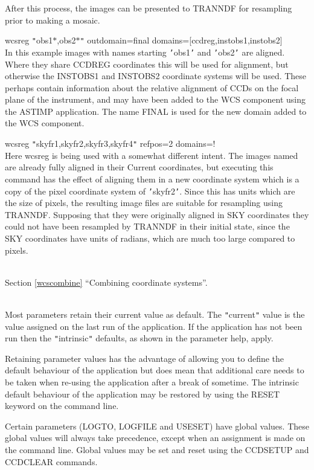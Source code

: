 \documentclass[twoside,11pt]{article}
\newcommand{\htmlref}[2]{#1}
\newcommand{\latexhtml}[2]{#1}
\renewcommand{\_}{\texttt{\symbol{95}}}
\newcommand{\qt}[1]{{\tt "}#1{\tt "}}
\newcommand{\routine}[1]{{\sc #1}}
\newcommand{\xroutine}[1]{\htmlref{{\sc #1}}{#1}}
\newcommand{\secref}[2]{\latexhtml{Section \ref{#1} ``#2''}{``\htmlref{#2}{#1}''}}
\newcommand{\sstexamplesubsection}[2]{\sloppy \item{\ssttt #1} \mbox{} \\ #2 }
\newcommand{\sstdiytopic}[2]{\item[#1:] \mbox{} \\[1.3ex] #2}
\newcommand{\sstexamplesubsection}[2]{\item[{\ssttt #1}] #2}
\newcommand{\sstdiytopic}[2]{\item[{#1:}] #2 }
\begin{document}
{{{         After this process, the images can be presented to TRANNDF for
         resampling prior to making a mosaic.
      }
      \sstexamplesubsection{
         wcsreg {\tt "}obs1\_$*$,obs2\_$*${\tt "} outdomain=final
             domains=[ccd\_reg,inst\_obs1,inst\_obs2]
      }{
         In this example images with names starting {\tt '}obs1\_{\tt '} and {\tt '}obs2\_{\tt '} are aligned.
         Where they share CCD\_REG coordinates this will be used for
         alignment, but otherwise the INST\_OBS1 and INST\_OBS2
         coordinate systems will be used.  These perhaps contain
         information about the relative alignment of CCDs on the focal
         plane of the instrument, and may have been added to the WCS
         component using the ASTIMP application.  The name FINAL is
         used for the new domain added to the WCS component.
      }
      \sstexamplesubsection{
         wcsreg {\tt "}skyfr1,skyfr2,skyfr3,skyfr4{\tt "} refpos=2 domains=!
      }{
         Here wcsreg is being used with a somewhat different intent.
         The images named are already fully aligned in their Current
         coordinates, but executing this command has the effect of
         aligning them in a new coordinate system which is a copy of
         the pixel coordinate system of {\tt '}skyfr2{\tt '}.  Since this has
         units which are the size of pixels, the resulting image files
         are suitable for resampling using \xroutine{TRANNDF}.  Supposing that
         they were originally aligned in SKY coordinates they could
         not have been resampled by \routine{TRANNDF} in their initial state,
         since the SKY coordinates have units of radians, which 
         are much too large compared to pixels.
      }
   }
   \sstdiytopic{
      See also
   } {
      \secref{wcscombine}{Combining coordinate systems}.
   }
   \sstdiytopic{
      Behaviour of parameters
   } {
      Most parameters retain their current value as default. The
      \qt{current} value is the value assigned on the last run of the
      application. If the application has not been run then the
      \qt{intrinsic} defaults, as shown in the parameter help, apply.

      Retaining parameter values has the advantage of allowing you to
      define the default behaviour of the application but does mean
      that additional care needs to be taken when re-using the
      application after a break of sometime. The intrinsic default
      behaviour of the application may be restored by using the RESET
      keyword on the command line.

      Certain parameters (LOGTO, LOGFILE and USESET) have global
      values. These global values will always take precedence, except
      when an assignment is made on the command line.  Global values may
      be set and reset using the \xroutine{CCDSETUP} and
      \xroutine{CCDCLEAR} commands.
   }
}
\end{document}
